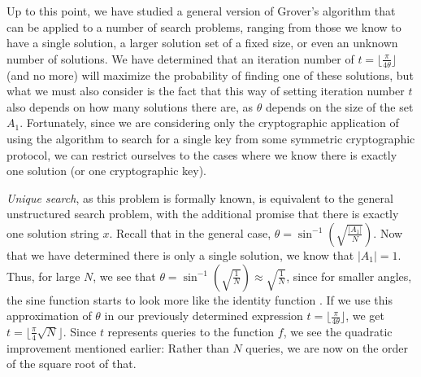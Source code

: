 Up to this point, we have studied a general version of Grover's algorithm that can be applied to a number of search problems, ranging from those we know to have a single solution, a larger solution set of a fixed size, or even an unknown number of solutions. We have determined that an iteration number of $t = \lfloor \frac{\pi}{4\theta} \rfloor$ (and no more) will maximize the probability of finding one of these solutions, but what we must also consider is the fact that this way of setting iteration number $t$ also depends on how many solutions there are, as $\theta$ depends on the size of the set $A_1$. Fortunately, since we are considering only the cryptographic application of using the algorithm to search for a single key from some symmetric cryptographic protocol, we can restrict ourselves to the cases where we know there is exactly one solution (or one cryptographic key).

\emph{Unique search}, as this problem is formally known, is equivalent to the general unstructured search problem, with the additional promise that there is exactly one solution string $x$. Recall that in the general case, $\theta = \sin ^{-1} \left (\sqrt{\frac{|A_1|}{N}} \right )$. Now that we have determined there is only a single solution, we know that $|A_1| = 1$. Thus, for large $N$, we see that $\theta = \sin ^{-1} \left (\sqrt{\frac{1}{N}} \right ) \approx \sqrt{\frac{1}{N}}$, since for smaller angles, the sine function starts to look more like the identity function \cite{Qiskit2023}. If we use this approximation of $\theta$ in our previously determined expression $t = \lfloor \frac{\pi}{4\theta} \rfloor$, we get $t = \lfloor \frac{\pi}{4}\sqrt{N} \rfloor$. Since $t$ represents queries to the function $f$, we see the quadratic improvement mentioned earlier: Rather than $N$ queries, we are now on the order of the square root of that. 

